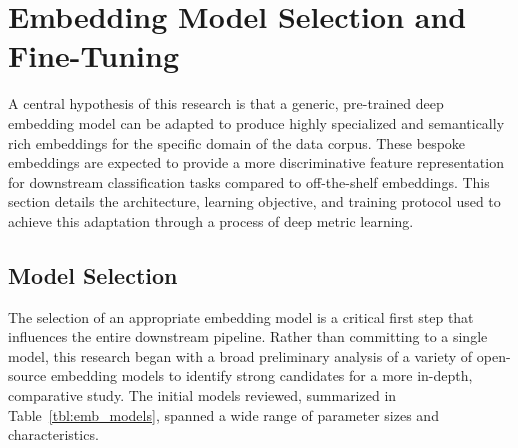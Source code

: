 \section{Embedding Model Selection and Fine-Tuning}
A central hypothesis of this research is that a generic, pre-trained deep embedding model can be adapted to produce highly specialized and semantically rich embeddings for the specific domain of the data corpus. These bespoke embeddings are expected to provide a more discriminative feature representation for downstream classification tasks compared to off-the-shelf embeddings. This section details the architecture, learning objective, and training protocol used to achieve this adaptation through a process of deep metric learning.

\subsection{Model Selection}
The selection of an appropriate embedding model is a critical first step that influences the entire downstream pipeline. Rather than committing to a single model, this research began with a broad preliminary analysis of a variety of open-source embedding models to identify strong candidates for a more in-depth, comparative study. The initial models reviewed, summarized in Table~\ref{tbl:emb_models}, spanned a wide range of parameter sizes and characteristics.
